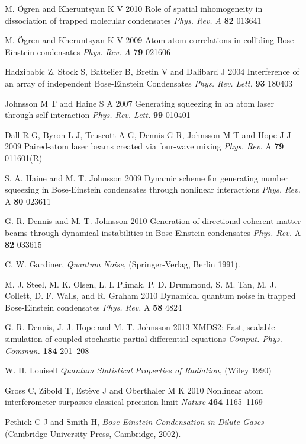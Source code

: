 \documentclass{iopart}
\begin{document}
\begin{thebibliography}{10}
 M. {\"{O}}gren and Kheruntsyan K V 2010 Role of spatial inhomogeneity in dissociation of trapped molecular condensates \emph{Phys. Rev. A} {\bf 82} 013641

 M. {\"{O}}gren and Kheruntsyan K V 2009 Atom-atom correlations in colliding Bose-Einstein condensates \emph{Phys. Rev. A} {\bf 79} 021606

 Hadzibabic Z, Stock S, Battelier B, Bretin V and Dalibard J 2004 Interference of an array of independent Bose-Einstein Condensates {\it Phys. Rev. Lett.} {\bf 93} 180403

 Johnsson M T and Haine S A 2007 Generating squeezing in an atom laser through self-interaction \emph{Phys. Rev. Lett.} {\bf 99} 010401

 Dall R G, Byron L J, Truscott A G, Dennis G R, Johnsson M T and Hope J J 2009 Paired-atom laser beams created via four-wave mixing \emph{Phys. Rev.} A {\bf 79} 011601(R)

 S. A. Haine and M. T. Johnsson 2009 Dynamic scheme for generating number squeezing in Bose-Einstein condensates through nonlinear interactions \emph{Phys. Rev.} A {\bf 80} 023611

 G. R. Dennis and M. T. Johnsson 2010 Generation of directional coherent matter beams through dynamical instabilities in Bose-Einstein condensates \emph{Phys. Rev.} A {\bf 82} 033615

 C. W. Gardiner, \emph{Quantum Noise}, (Springer-Verlag, Berlin 1991).

 M. J. Steel, M. K. Olsen, L. I. Plimak, P. D. Drummond, S. M. Tan, M. J. Collett, D. F. Walls, and R. Graham 2010 Dynamical quantum noise in trapped Bose-Einstein condensates \emph{Phys. Rev.} A {\bf 58} 4824

 G. R. Dennis, J. J. Hope and M. T. Johnsson 2013 XMDS2: Fast, scalable simulation of coupled stochastic partial differential equations {\it Comput. Phys. Commun.} {\bf 184} 201--208

 W. H. Louisell \emph{Quantum Statistical Properties of Radiation}, (Wiley 1990)

 Gross C, Zibold T, Est{\`{e}}ve J and Oberthaler M K 2010 Nonlinear atom interferometer surpasses classical precision limit \emph{Nature} {\bf 464} 1165--1169

 Pethick C J and Smith H, \emph{Bose-Einstein Condensation in Dilute Gases} (Cambridge University Press, Cambridge, 2002).

\end{thebibliography}
\end{document}
